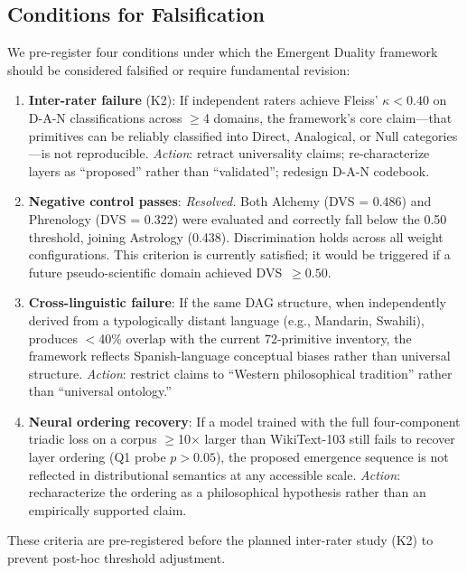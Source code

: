 \documentclass[11pt, a4paper]{article}
\begin{document}
\subsection{Conditions for Falsification}
\label{sec:falsification}

We pre-register four conditions under which the Emergent Duality framework should be considered falsified or require fundamental revision:

\begin{enumerate}[nosep, leftmargin=*]
    \item \textbf{Inter-rater failure} (K2): If independent raters achieve Fleiss' $\kappa < 0.40$ on D-A-N classifications across $\geq$4 domains, the framework's core claim---that primitives can be reliably classified into Direct, Analogical, or Null categories---is not reproducible. \emph{Action}: retract universality claims; re-characterize layers as ``proposed'' rather than ``validated''; redesign D-A-N codebook.

    \item \textbf{Negative control passes}: \emph{Resolved.} Both Alchemy (DVS = 0.486) and Phrenology (DVS = 0.322) were evaluated and correctly fall below the 0.50 threshold, joining Astrology (0.438). Discrimination holds across all weight configurations. This criterion is currently satisfied; it would be triggered if a future pseudo-scientific domain achieved DVS~$\geq 0.50$.

    \item \textbf{Cross-linguistic failure}: If the same DAG structure, when independently derived from a typologically distant language (e.g., Mandarin, Swahili), produces $<$40\% overlap with the current 72-primitive inventory, the framework reflects Spanish-language conceptual biases rather than universal structure. \emph{Action}: restrict claims to ``Western philosophical tradition'' rather than ``universal ontology.''

    \item \textbf{Neural ordering recovery}: If a model trained with the full four-component triadic loss on a corpus $\geq$10$\times$ larger than WikiText-103 still fails to recover layer ordering (Q1 probe $p > 0.05$), the proposed emergence sequence is not reflected in distributional semantics at any accessible scale. \emph{Action}: recharacterize the ordering as a philosophical hypothesis rather than an empirically supported claim.
\end{enumerate}

These criteria are pre-registered before the planned inter-rater study (K2) to prevent post-hoc threshold adjustment.
\end{document}
